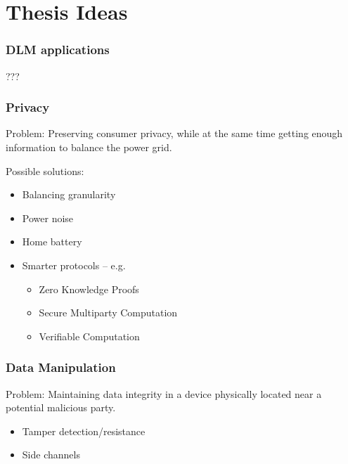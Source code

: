 
\section{Thesis Ideas}

\begin{frame}
  \frametitle{DLM applications}

  ???
\end{frame}

\begin{frame}
  \frametitle{Privacy}

  Problem: Preserving consumer privacy, while at the same time getting enough information to balance the power grid.

  Possible solutions:
  \begin{itemize}
    \item Balancing granularity
    \item Power noise
    \item Home battery
    \item Smarter protocols -- e.g.
    \begin{itemize}
      \item Zero Knowledge Proofs
      \item Secure Multiparty Computation
      \item Verifiable Computation
    \end{itemize}
  \end{itemize}
\end{frame}

\begin{frame}
  \frametitle{Data Manipulation}

  Problem: Maintaining data integrity in a device physically located near a potential malicious party.

  \begin{itemize}
    \item Tamper detection/resistance
    \item Side channels
  \end{itemize}
\end{frame}
